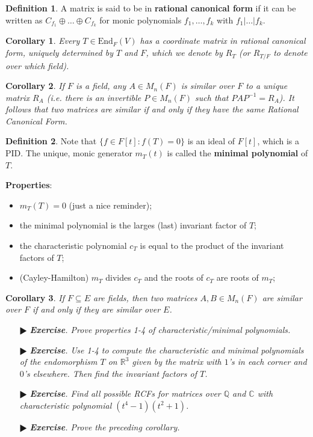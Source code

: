 \documentclass[11pt]{amsart}
\newtheorem*{corollary*}{Corollary}
\theoremstyle{definition}
\newtheorem*{definition*}{Definition}
\renewcommand\:{\colon}
\newcommand{\Q}{\mathds{Q}}
\newcommand{\R}{\mathds{R}}
\newcommand{\1}{\mathds{1}}
\newcommand{\End}{\text{End}}
\newcommand{\exc}[1]{\vspace{-2.5pt}\begin{itemize}[leftmargin=15pt]\item[$\RHD$] \textit{\textbf{Exercise}. #1}\end{itemize}}
\begin{document}
\begin{definition*}
	A matrix is said to be in \textbf{rational canonical form} if it can be written as $C_{f_1} \oplus \dots \oplus C_{f_k}$ for monic polynomials $f_1, \dots, f_k$ with $f_1 | \dots | f_k$.
\end{definition*}

\begin{corollary*}
	Every $T \in \End_F(V)$ has a coordinate matrix in rational canonical form, uniquely determined by $T$ and $F$, which we denote by $R_T$ \textnormal{(}or $R_{T/F}$ to denote over which field\textnormal{)}.
\end{corollary*}

\begin{corollary*}
	If $F$ is a field, any $A \in M_n(F)$ is similar over $F$ to a unique matrix $R_A$ \textnormal{(}i.e. there is an invertible $P \in M_n(F)$ such that $PAP^{-1} = R_A$\textnormal{)}. It follows that two matrices are similar if and only if they have the same Rational Canonical Form.
\end{corollary*}

\begin{definition*}
	Note that $\{ f \in F[t] : f(T) = 0 \}$ is an ideal of $F[t]$, which is a PID. The unique, monic generator $m_T(t)$ is called the \textbf{minimal polynomial} of $T$.
\end{definition*}

\noindent \textbf{Properties}:
\begin{itemize}[leftmargin=*]\setlength\itemsep{0em}
	\item $m_T(T) = 0$ (just a nice reminder);
	\item the minimal polynomial is the larges (last) invariant factor of $T$;
	\item the characteristic polynomial $c_T$ is equal to the product of the invariant factors of $T$;
	\item (Cayley-Hamilton) $m_T$ divides $c_T$ and the roots of $c_T$ are roots of $m_T$;
\end{itemize}

\begin{corollary*}
	If $F \subseteq E$ are fields, then two matrices $A, B \in M_n(F)$ are similar over $F$ if and only if they are similar over $E$.
\end{corollary*}

\clearpage %

\exc{Prove properties 1-4 of characteristic/minimal polynomials.}
\exc{Use 1-4 to compute the characteristic and minimal polynomials of the endomorphism $T$ on $\R^3$ given by the matrix with $1$'s in each corner and $0$'s elsewhere. Then find the invariant factors of $T$.}
\exc{Find all possible RCFs for matrices over $\Q$ and $\mathds C$ with characteristic polynomial $(t^4 - 1)(t^2 + 1)$.}
\exc{Prove the preceding corollary.}
\end{document}

